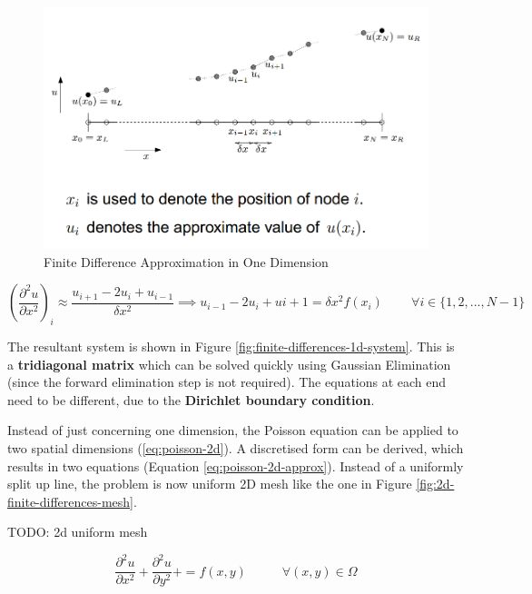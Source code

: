 \documentclass{article}
\begin{document}
\begin{figure}
	\centering
	\includegraphics[scale=0.35]{figures/1d-finite-differences.png}
	\caption{Finite Difference Approximation in One Dimension}
	\label{fig:finite-differences}
\end{figure}

\begin{equation}
	{\left( \frac{\partial^2 u}{\partial x^2}\right)}_i \approx \frac{u_{i+1} - 2u_i + u_{i - 1}}{\delta x^2} 
	\implies
	u_{i - 1} - 2u_i + u{i + 1} = \delta x^2 f(x_i)
	\;\;\;\;\;\;\;\; \forall 
	i \in \lbrace 1, 2, ..., N - 1 \rbrace
	\label{eq:finite-differences-1d-node}
\end{equation}

The resultant system is shown in Figure \ref{fig:finite-differences-1d-system}. This is a \textbf{tridiagonal matrix} which can be solved quickly using Gaussian Elimination (since the forward elimination step is not required). The equations at each end need to be different, due to the \textbf{Dirichlet boundary condition}.

Instead of just concerning one dimension, the Poisson equation can be applied to two spatial dimensions (\ref{eq:poisson-2d}). A discretised form can be derived, which results in two equations (Equation \ref{eq:poisson-2d-approx}). Instead of a uniformly split up line, the problem is now uniform 2D mesh like the one in Figure \ref{fig:2d-finite-differences-mesh}.

TODO: 2d uniform mesh

\begin{equation}
	\frac{\partial^2 u}{\partial x^2} + \frac{\partial^2 u}{\partial y^2} +  = f(x, y)
	\;\;\;\;\;\;\;\;\;\; \forall (x, y) \in \Omega
	\label{eq:poisson-2d}
\end{equation}
\end{document}
